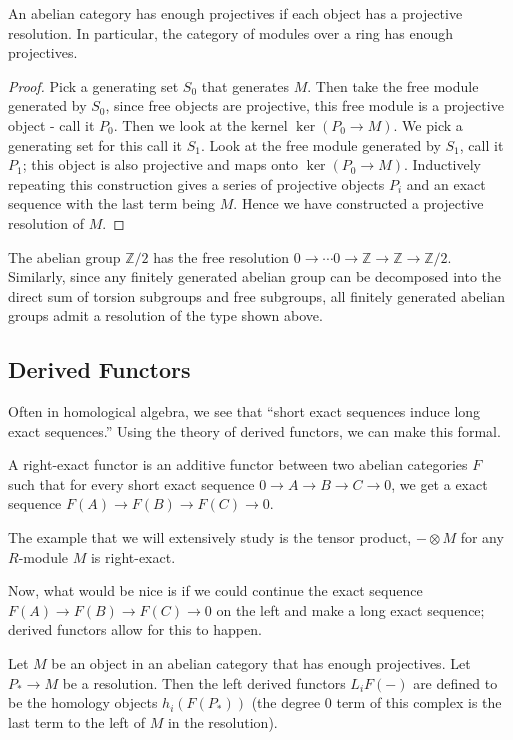 \begin{theorem}An abelian category has enough projectives if each object has a
projective resolution. In particular, the category of modules over a ring has
enough projectives. \end{theorem}
\begin{proof} Pick a generating set $S_0$ that generates $M$. Then take the free
module generated by $S_0$, since free objects are projective, this free module
is a projective object - call it $P_0$. Then we look at the kernel
$\ker(P_0\rightarrow M)$. We pick a generating set for this call it $S_1$. Look
at the free module generated by $S_1$, call it $P_1$; this object is also
projective and maps onto $\ker(P_0\rightarrow M)$. Inductively repeating this
construction gives a series of projective objects $P_i$ and an exact sequence
with the last term being $M$. Hence we have constructed a projective resolution
of $M$. \end{proof}


\begin{example} The abelian group $\mathbb{Z}/2$ has the free resolution $0\rightarrow\cdots 0\rightarrow\mathbb{Z}\rightarrow\mathbb{Z}\rightarrow\mathbb{Z}/2$.
Similarly, since any finitely generated abelian group can be decomposed into the direct sum of torsion subgroups and free subgroups, all finitely generated abelian groups admit a resolution of the type shown above.\end{example}

\subsection{Derived Functors}
Often in homological algebra, we see that ``short exact sequences induce long exact sequences.'' Using the theory of derived functors, we can make this formal.

\begin{definition} A right-exact functor is an additive functor between two abelian categories $F$ such that for every short exact sequence $0\rightarrow A\rightarrow B\rightarrow C\rightarrow 0$, we get a exact sequence $F(A)\rightarrow F(B)\rightarrow F(C)\rightarrow 0$.
\end{definition}


\begin{example} The example that we will extensively study is the tensor product, $-\otimes M$ for any $R$-module $M$ is right-exact.\end{example}
Now, what would be nice is if we could continue the exact sequence $F(A)\rightarrow F(B)\rightarrow F(C)\rightarrow 0$ on the left and make a long exact sequence; derived functors allow for this to happen.

\begin{definition} Let $M$ be an object in an abelian category that has enough projectives. Let $P_*\rightarrow M$ be a resolution. Then the left derived functors $L_iF(-)$ are defined to be the homology objects $h_i(F(P_*))$ (the degree $0$ term of this complex is the last term to the left of $M$ in the resolution).\end{definition}

